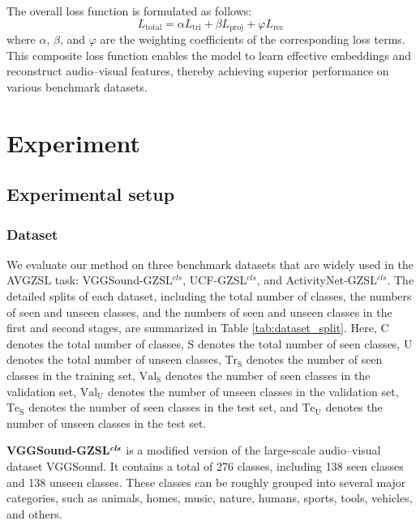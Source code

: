\documentclass[lettersize,journal]{IEEEtran}
\begin{document}
The overall loss function is formulated as follows:
\begin{equation}
\label{eq:total_loss}
L_{\mathrm{total}}=\alpha L_{\mathrm{tri}}+\beta L_{\mathrm{proj}}+\varphi L_{\mathrm{rec}}
\end{equation}
where $\alpha$, $\beta$, and $\varphi$ are the weighting coefficients of the corresponding loss terms. This composite loss function enables the model to learn effective embeddings and reconstruct audio–visual features, thereby achieving superior performance on various benchmark datasets.


\section{Experiment}



\subsection{Experimental setup}
\subsubsection{Dataset}
We evaluate our method on three benchmark datasets that are widely used in the AVGZSL task: VGGSound-GZSL$^{\textit{cls}}$, UCF-GZSL$^{\textit{cls}}$, and ActivityNet-GZSL$^{\textit{cls}}$. The detailed splits of each dataset, including the total number of classes, the numbers of seen and unseen classes, and the numbers of seen and unseen classes in the first and second stages, are summarized in Table \ref{tab:dataset_split}. Here, C denotes the total number of classes, S denotes the total number of seen classes, U denotes the total number of unseen classes, $\text{Tr}_\text{S}$ denotes the number of seen classes in the training set, $\text{Val}_\text{S}$ denotes the number of seen classes in the validation set, $\text{Val}_\text{U}$ denotes the number of unseen classes in the validation set, $\text{Te}_\text{S}$ denotes the number of seen classes in the test set, and $\text{Te}_\text{U}$ denotes the number of unseen classes in the test set.


\textbf{VGGSound-GZSL}$^{\textbf{\textit{cls}}}$ is a modified version of the large-scale audio–visual dataset VGGSound\cite{34}. It contains a total of 276 classes, including 138 seen classes and 138 unseen classes. These classes can be roughly grouped into several major categories, such as animals, homes, music, nature, humans, sports, tools, vehicles, and others.
\end{document}
